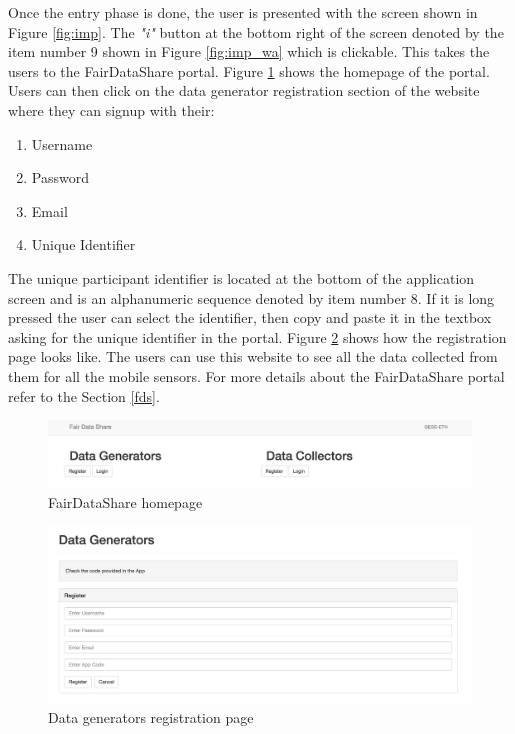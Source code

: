 Once the entry phase is done, the user is presented with the screen shown in Figure \ref{fig:imp}.
The {\it "i"} button at the bottom right of the screen denoted by the item number 9 shown in Figure \ref{fig:imp_wa} which is clickable. This takes the users to the FairDataShare portal. Figure \ref{fig:fds_home} shows the homepage of the portal. Users can then click on the data generator registration section of the website where they can signup with their:

\begin{enumerate}
    \item Username
    \item Password
    \item Email
    \item Unique Identifier
\end{enumerate}

The unique participant identifier is located at the bottom of the application screen and is an alphanumeric sequence denoted by item number 8. If it is long pressed the user can select the identifier, then copy and paste it in the textbox asking for the unique identifier in the portal. Figure \ref{fig:first} shows how the registration page looks like.
The users can use this website to see all the data collected from them for all the mobile sensors. For more details about the FairDataShare portal
refer to the Section \ref{fds}.
%

\begin{figure}[ht!]
\centering
\includegraphics[width=\textwidth,keepaspectratio]{./images/fds1}
\caption{FairDataShare homepage}
\label{fig:fds_home}
\end{figure}

\begin{figure}[ht!]
\centering
\includegraphics[width=\textwidth,keepaspectratio]{./images/fds_user_register1}
\caption{Data generators registration page}
\label{fig:first}
\end{figure}

